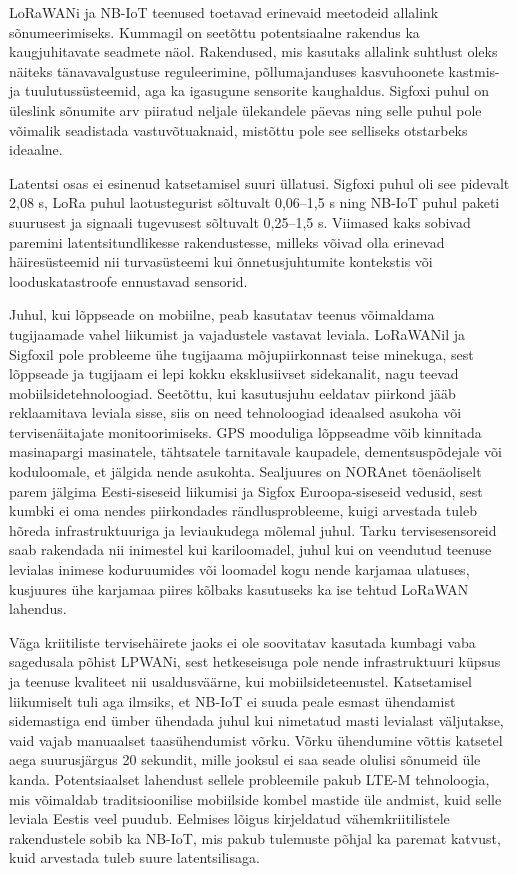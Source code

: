 \documentclass[12pt]{article}
\begin{document}
    LoRaWANi ja NB-IoT teenused toetavad erinevaid meetodeid allalink sõnumeerimiseks.
    Kummagil on seetõttu potentsiaalne rakendus ka kaugjuhitavate seadmete näol.
    Rakendused, mis kasutaks allalink suhtlust oleks näiteks tänavavalgustuse reguleerimine, põllumajanduses kasvuhoonete kastmis- ja tuulutussüsteemid, aga ka igasugune sensorite kaughaldus.
    Sigfoxi puhul on üleslink sõnumite arv piiratud neljale ülekandele päevas ning selle puhul pole võimalik seadistada vastuvõtuaknaid, mistõttu pole see selliseks otstarbeks ideaalne.

    Latentsi osas ei esinenud katsetamisel suuri üllatusi.
    Sigfoxi puhul oli see pidevalt 2,08 s, LoRa puhul laotustegurist sõltuvalt 0,06--1,5 s ning NB-IoT puhul paketi suurusest ja signaali tugevusest sõltuvalt 0,25--1,5 s.
    Viimased kaks sobivad paremini latentsitundlikesse rakendustesse, milleks võivad olla erinevad häiresüsteemid nii turvasüsteemi kui õnnetusjuhtumite kontekstis või looduskatastroofe ennustavad sensorid.

    Juhul, kui lõppseade on mobiilne, peab kasutatav teenus võimaldama tugijaamade vahel liikumist ja vajadustele vastavat leviala.
    LoRaWANil ja Sigfoxil pole probleeme ühe tugijaama mõjupiirkonnast teise minekuga, sest lõppseade ja tugijaam ei lepi kokku eksklusiivset sidekanalit, nagu teevad mobiilsidetehnoloogiad.
    Seetõttu, kui kasutusjuhu eeldatav piirkond jääb reklaamitava leviala sisse, siis on need tehnoloogiad ideaalsed asukoha või tervisenäitajate monitoorimiseks.
    GPS mooduliga lõppseadme võib kinnitada masinapargi masinatele, tähtsatele tarnitavale kaupadele, dementsuspõdejale või koduloomale, et jälgida nende asukohta.
    Sealjuures on NORAnet tõenäoliselt parem jälgima Eesti-siseseid liikumisi ja Sigfox Euroopa-siseseid vedusid, sest kumbki ei oma nendes piirkondades rändlusprobleeme, kuigi arvestada tuleb hõreda infrastruktuuriga ja leviaukudega mõlemal juhul.
    Tarku tervisesensoreid saab rakendada nii inimestel kui kariloomadel, juhul kui on veendutud teenuse levialas inimese koduruumides või loomadel kogu nende karjamaa ulatuses, kusjuures ühe karjamaa piires kõlbaks kasutuseks ka ise tehtud LoRaWAN lahendus.

    Väga kriitiliste tervisehäirete jaoks ei ole soovitatav kasutada kumbagi vaba sagedusala põhist LPWANi, sest hetkeseisuga pole nende infrastruktuuri küpsus ja teenuse kvaliteet nii usaldusväärne, kui mobiilsideteenustel.
    Katsetamisel liikumiselt tuli aga ilmsiks, et NB-IoT ei suuda peale esmast ühendamist sidemastiga end ümber ühendada juhul kui nimetatud masti levialast väljutakse, vaid vajab manuaalset taasühendumist võrku.
    Võrku ühendumine võttis katsetel aega suurusjärgus 20 sekundit, mille jooksul ei saa seade olulisi sõnumeid üle kanda.
    Potentsiaalset lahendust sellele probleemile pakub LTE-M tehnoloogia, mis võimaldab traditsioonilise mobiilside kombel mastide üle andmist, kuid selle leviala Eestis veel puudub.
    Eelmises lõigus kirjeldatud vähemkriitilistele rakendustele sobib ka NB-IoT, mis pakub tulemuste põhjal ka paremat katvust, kuid arvestada tuleb suure latentsilisaga.
\end{document}
